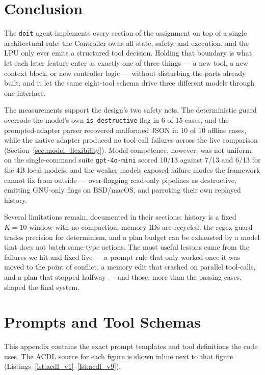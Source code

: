 \documentclass[11pt,a4paper]{article}
\begin{document}


\section{Conclusion}
\label{sec:conclusion}
The \texttt{doit} agent implements every section of the assignment on top of a single architectural rule: the Controller owns all state, safety, and execution, and the LPU only ever emits a structured tool decision. Holding that boundary is what let each later feature enter as exactly one of three things --- a new tool, a new context block, or new controller logic --- without disturbing the parts already built, and it let the same eight-tool schema drive three different models through one interface.

The measurements support the design's two safety nets. The deterministic guard overrode the model's own \texttt{is\_destructive} flag in 6 of 15 cases, and the prompted-adapter parser recovered malformed JSON in 10 of 10 offline cases, while the native adapter produced no tool-call failures across the live comparison (Section~\ref{sec:model_flexibility}). Model competence, however, was not uniform: on the single-command suite \texttt{gpt-4o-mini} scored 10/13 against 7/13 and 6/13 for the 4B local models, and the weaker models exposed failure modes the framework cannot fix from outside --- over-flagging read-only pipelines as destructive, emitting GNU-only flags on BSD/macOS, and parroting their own replayed history.

Several limitations remain, documented in their sections: history is a fixed $K=10$ window with no compaction, memory IDs are recycled, the regex guard trades precision for determinism, and a plan budget can be exhausted by a model that does not batch same-type actions. The most useful lessons came from the failures we hit and fixed live --- a prompt rule that only worked once it was moved to the point of conflict, a memory edit that crashed on parallel tool-calls, and a plan that stopped halfway --- and those, more than the passing cases, shaped the final system.

\appendix

\section{Prompts and Tool Schemas}
\label{sec:appendix_prompts}
This appendix contains the exact prompt templates and tool definitions the code uses. The ACDL source for each figure is shown inline next to that figure (Listings~\ref{lst:acdl_v1}--\ref{lst:acdl_v9}).
\end{document}
